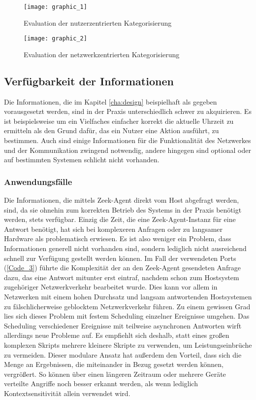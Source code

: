 \begin{figure}[H]
\texttt{[image: graphic\_1]}
\caption{Evaluation der nutzerzentrierten Kategorisierung}
\label{Tax_Ev_1}
\end{figure}

\begin{figure}
\texttt{[image: graphic\_2]}
\caption{Evaluation der netzwerkzentrierten Kategorisierung}
\label{Tax_Ev_2}
\end{figure}

\subsection{Verfügbarkeit der Informationen}
Die Informationen, die im Kapitel \ref{cha:design} beispielhaft als gegeben vorausgesetzt werden, sind in der Praxis unterschiedlich schwer zu akquirieren. Es ist beispielsweise um ein Vielfaches einfacher korrekt die aktuelle Uhrzeit zu ermitteln als den Grund dafür, das ein Nutzer eine Aktion ausführt, zu bestimmen. Auch sind einige Informationen für die Funktionalität des Netzwerkes und der Kommunikation zwingend notwendig, andere hingegen sind optional oder auf bestimmten Systemen schlicht nicht vorhanden.
\subsubsection{Anwendungsfälle}
Die Informationen, die mittels Zeek-Agent direkt vom Host abgefragt werden, sind, da sie ohnehin zum korrekten Betrieb des Systems in der Praxis benötigt werden, stets verfügbar. Einzig die Zeit, die eine Zeek-Agent-Instanz für eine Antwort benötigt, hat sich bei komplexeren Anfragen oder zu langsamer Hardware als problematisch erwiesen. Es ist also weniger ein Problem, dass Informationen generell nicht vorhanden sind, sondern lediglich nicht ausreichend schnell zur Verfügung gestellt werden können. Im Fall der verwendeten Ports (\ref{Code_3}) führte die Komplexität der an den Zeek-Agent gesendeten Anfrage dazu, das eine Antwort mitunter erst eintraf, nachdem schon zum Hostsystem zugehöriger Netzwerkverkehr bearbeitet wurde. Dies kann vor allem in Netzwerken mit einem hohen Durchsatz und langsam antwortenden Hostsystemen zu fälschlicherweise geblocktem Netzwerkverkehr führen. Zu einem gewissen Grad lies sich dieses Problem mit festem Scheduling einzelner Ereignisse umgehen. Das Scheduling verschiedener Ereignisse mit teilweise asynchronen Antworten wirft allerdings neue Probleme auf. Es empfiehlt sich deshalb, statt eines großen komplexen Skripts mehrere kleinere Skripte zu verwenden, um Leistungseinbrüche zu vermeiden. Dieser modulare Ansatz hat außerdem den Vorteil, dass sich die Menge an Ergebnissen, die miteinander in Bezug gesetzt werden können, vergrößert. So können über einen längeren Zeitraum oder mehrere Geräte verteilte Angriffe noch besser erkannt werden, als wenn lediglich Kontextsensitivität allein verwendet wird.
